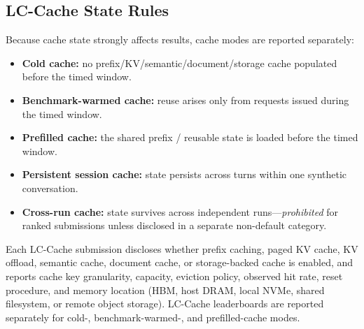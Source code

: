 \subsection{LC-Cache State Rules}
\label{subsec:cache_rules}
Because cache state strongly affects results, cache modes are reported separately:
\begin{itemize}
    \item \textbf{Cold cache:} no prefix/KV/semantic/document/storage cache populated before the timed window.
    \item \textbf{Benchmark-warmed cache:} reuse arises only from requests issued during the timed window.
    \item \textbf{Prefilled cache:} the shared prefix / reusable state is loaded before the timed window.
    \item \textbf{Persistent session cache:} state persists across turns within one synthetic conversation.
    \item \textbf{Cross-run cache:} state survives across independent runs---\emph{prohibited} for ranked submissions unless disclosed in a separate non-default category.
\end{itemize}
Each LC-Cache submission discloses whether prefix caching, paged KV cache, KV
offload, semantic cache, document cache, or storage-backed cache is enabled, and
reports cache key granularity, capacity, eviction policy, observed hit rate, reset
procedure, and memory location (HBM, host DRAM, local NVMe, shared filesystem, or
remote object storage). LC-Cache leaderboards are reported separately for
cold-, benchmark-warmed-, and prefilled-cache modes.

